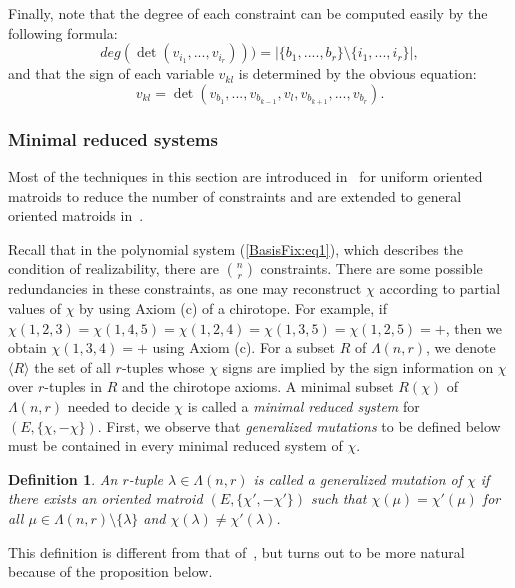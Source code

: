 \documentclass{article}
\newtheorem{defn2}[thm]{\bfseries Definition}
\begin{document}
Finally, note that the degree of each constraint can be computed easily by the following formula:
\[ deg(\det(v_{i_{1}},...,v_{i_{r}})))= |\{ b_{1},....,b_{r} \} \setminus \{ i_{1},...,i_{r} \} |, \]
and that the sign of each variable $v_{kl}$ is determined by the obvious equation:
\[ v_{kl}=\det(v_{b_{1}},...,v_{b_{k-1}},v_{l},v_{b_{k+1}},...,v_{b_{r}}).\]




\subsubsection{Minimal reduced systems} \label{MinReduced}
Most of the techniques in this section are
introduced in~\cite{BS86} for uniform oriented matroids
to reduce the number of constraints
and are extended to general oriented matroids in~\cite{N07,NMF07}.

Recall that in the polynomial system (\ref{BasisFix:eq1}), which describes the condition of realizability, there are $\binom{n}{r}$ constraints.  
There are some possible redundancies in these constraints, as one may reconstruct $\chi$ according to partial values of $\chi$ by 
using Axiom (c) of a chirotope.
For example, if $\chi (1,2,3)=\chi (1,4,5)=\chi (1,2,4)=\chi (1,3,5) = \chi (1,2,5)=+$,
then we obtain $\chi (1,3,4)=+$ using Axiom (c).
For a subset $R$ of $\Lambda (n,r)$, we denote $\langle R \rangle$
the set of all $r$-tuples whose $\chi$ signs are implied by the sign information
on $\chi$ over $r$-tuples in $R$ and the chirotope axioms.   
A minimal subset $R(\chi )$ of $\Lambda (n,r)$ needed to decide $\chi$ is called a {\it minimal reduced system\/}
for $(E,\{ \chi , - \chi \} )$.
First, we observe that {\it generalized mutations} to be defined below
must be contained in every minimal reduced system of $\chi$.
\begin{defn2}
An $r$-tuple $\lambda \in \Lambda (n,r)$ is called a {\it generalized mutation\/} of $\chi$ if there exists an oriented matroid $(E ,\{ \chi',-\chi'\})$
such that
$\chi (\mu ) = \chi'(\mu )$ for all $\mu \in \Lambda (n,r) \setminus \{ \lambda \}$
and
$\chi (\lambda ) \neq \chi'(\lambda )$.
\end{defn2}
This definition is different from that of~\cite{NMF07,N07}, but turns out 
to be more natural because of the proposition below.
\end{document}
